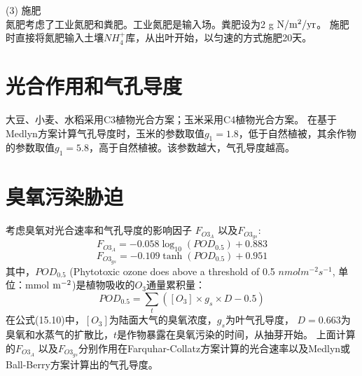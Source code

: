 (3) 施肥\\
氮肥考虑了工业氮肥和粪肥。工业氮肥是输入场。粪肥设为2 g $\rm N/m^2/yr$。
施肥时直接将氮肥输入土壤$NH_4^{+}$库，从出叶开始，以匀速的方式施肥20天。


\section{光合作用和气孔导度}
大豆、小麦、水稻采用C3植物光合方案；玉米采用C4植物光合方案。
在基于Medlyn方案计算气孔导度时，玉米的参数取值$g_1=1.8$，低于自然植被，其余作物的参数取值$g_1=5.8$，高于自然植被。该参数越大，气孔导度越高。


\section{臭氧污染胁迫}
考虑臭氧对光合速率和气孔导度的影响因子 $F_{O3_A}$ 以及$F_{O3_{gs}}$:
\begin{equation}
F_{O3_{A}}=-0.058 \log _{10}\left(POD_{0.5}\right)+0.883
\end{equation}
\begin{equation}
F_{O3_{gs}}=-0.109 \tanh \left(POD_{0.5}\right)+0.951
\end{equation}
其中，$POD_{0.5}$ (Phytotoxic ozone does above a threshold of 0.5 $nmol m^{-2} s^{-1}$,  单位：mmol $\rm m^{-2}$)是植物吸收的$O_3$通量累积量：
\begin{equation}
POD_{0.5}=\sum_{t}\left(\left[{O}_{3}\right] \times g_{s} \times D-0.5\right)
\end{equation}
在公式(15.10)中，$\left[{O}_{3}\right]$为陆面大气的臭氧浓度，$g_{s}$为叶气孔导度，
$D=0.663$为臭氧和水蒸气的扩散比，$t$是作物暴露在臭氧污染的时间，从抽芽开始。
上面计算的$F_{{O3}_A}$ 以及$F_{O3_{gs}}$分别作用在Farquhar-Collatz方案计算的光合速率以及Medlyn或Ball-Berry方案计算出的气孔导度。


